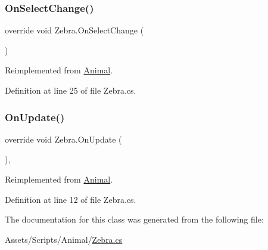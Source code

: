 \subsubsection{\texorpdfstring{On\+Select\+Change()}{OnSelectChange()}}
{\footnotesize\ttfamily override void Zebra.\+On\+Select\+Change (\begin{DoxyParamCaption}{ }\end{DoxyParamCaption})\hspace{0.3cm}{\ttfamily [virtual]}}



Reimplemented from \mbox{\hyperlink{class_animal_a10f83b51d56e077b400cf6b81b8f9aed}{Animal}}.



Definition at line 25 of file Zebra.\+cs.

\mbox{\label{class_zebra_af47a27c78f160200774e3b6e740e52be}} 
\subsubsection{\texorpdfstring{On\+Update()}{OnUpdate()}}
{\footnotesize\ttfamily override void Zebra.\+On\+Update (\begin{DoxyParamCaption}{ }\end{DoxyParamCaption})\hspace{0.3cm}{\ttfamily [protected]}, {\ttfamily [virtual]}}



Reimplemented from \mbox{\hyperlink{class_animal_a0b0cf85dbc03ad6ed1878e90c2ac84b1}{Animal}}.



Definition at line 12 of file Zebra.\+cs.



The documentation for this class was generated from the following file\+:\begin{DoxyCompactItemize}
\item 
Assets/\+Scripts/\+Animal/\mbox{\hyperlink{_zebra_8cs}{Zebra.\+cs}}\end{DoxyCompactItemize}
